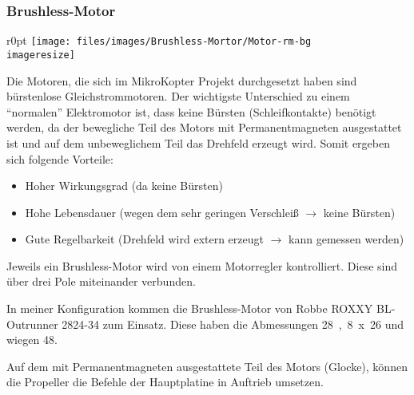 \subsubsection{Brushless-Motor}
\begin{wrapfigure}{r}{0pt}
	\texttt{[image: files/images/Brushless-Mortor/Motor-rm-bg\\imageresize]}
	\label{fig:Brushless-Mortor-Robbe}
\end{wrapfigure}

Die Motoren, die sich im MikroKopter Projekt durchgesetzt haben sind bürstenlose Gleichstrommotoren.
Der wichtigste Unterschied zu einem \enquote{normalen} Elektromotor ist,
dass keine Bürsten (Schleifkontakte) benötigt werden,
da der bewegliche Teil des Motors mit Permanentmagneten ausgestattet ist
und auf dem unbeweglichem Teil das Drehfeld erzeugt wird.
Somit ergeben sich folgende Vorteile:
\begin{itemize}
	\item Hoher Wirkungsgrad (da keine Bürsten)
	\item Hohe Lebensdauer
		(wegen dem sehr geringen Verschleiß $\rightarrow$ keine Bürsten)
	\item Gute Regelbarkeit
		(Drehfeld wird extern erzeugt $\rightarrow$ kann gemessen werden)
\end{itemize}

Jeweils ein Brushless-Motor wird von einem Motorregler kontrolliert.
Diese sind über drei Pole miteinander verbunden.

In meiner Konfiguration kommen die Brushless-Motor von Robbe ROXXY
BL-Outrunner 2824-34 zum Einsatz.
Diese haben die Abmessungen \unit{28,8 x 26}{\milli\metre}
und wiegen \unit{48}{\gram}.

Auf dem mit Permanentmagneten ausgestattete Teil des Motors (Glocke),
können die Propeller die Befehle der Hauptplatine in Auftrieb umsetzen.
